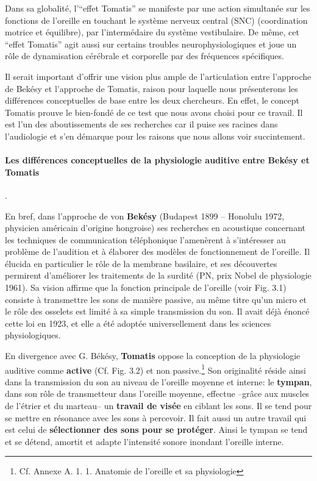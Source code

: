 Dans sa globalité, l'``effet Tomatis'' se manifeste par une action
simultanée sur les fonctions de
l'oreille en touchant le système nerveux central (SNC) (coordination
                motrice et équilibre), par l'intermédaire du système
                vestibulaire.
                De même, cet ``effet Tomatis'' agit aussi sur certains troubles
                neurophysiologiques et  joue un rôle de dynamisation cérébrale et corporelle
                par des fréquences spécifiques.


Il serait important d'offrir une vision plus ample de
l'articulation entre l'approche de Bekésy et l'approche de Tomatis,
raison pour laquelle nous présenterons les différences conceptuelles de
base entre les deux chercheurs.
En effet, le concept Tomatis prouve le bien-fondé de ce test que nous
avons choisi pour ce travail.
Il est l'un des aboutissements de
ses recherches car il puise ses racines dans l'audiologie et s'en
démarque pour les raisons que nous allons voir succintement.
\paragraph{Les différences conceptuelles de la physiologie auditive
  entre Bekésy et Tomatis}.

En bref, dans  l'approche de von\textbf{ Bekésy} (Budapest 1899 -- Honolulu 1972,
physicien américain d'origine hongroise) ses
recherches en acoustique concernant les techniques de communication
téléphonique l'amenèrent à s'intéresser au problème de l'audition et à
élaborer des modèles de fonctionnement de l'oreille. Il élucida en
particulier le rôle de la membrane basilaire, et ses découvertes
permirent d'améliorer les traitements de la surdité (PN, prix
Nobel de physiologie 1961).
Sa vision affirme que la fonction principale de l'oreille (voir
Fig. 3.1)
consiste à transmettre les sons de manière passive, au même titre qu'un micro et le rôle des osselets
est limité à sa simple transmission du
son. Il avait déjà énoncé cette loi en 1923, et elle a été adoptée
universellement dans les sciences physiologiques.


En divergence avec G. Békésy, \textbf{Tomatis} oppose la conception de la
physiologie auditive comme \textbf{active} (Cf. Fig. 3.2) et non
passive.\footnote{Cf. Annexe A. 1. 1. Anatomie de l'oreille et sa physiologie}
Son originalité réside ainsi dans la transmission du son
au niveau de l'oreille moyenne et interne:
le \textbf{tympan}, dans son rôle de transmetteur dans l'oreille
          moyenne, effectue --grâce aux muscles de l'étrier et du marteau--
		un\textbf{ travail de visée} en ciblant les sons. Il
se tend
		pour se mettre en résonance avec les sons à percevoir.
                Il fait aussi un autre travail qui est celui de \textbf{sélectionner des
sons
		pour se protéger}. Ainsi le tympan se tend et se détend,
              amortit et adapte
l'intensité
		sonore inondant  l'oreille interne.


